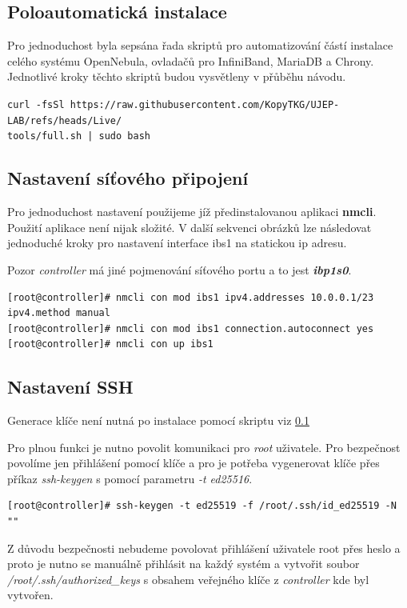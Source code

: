 \newpage

\subsection{Poloautomatická instalace}
\label{Skript}
Pro jednoduchost byla sepsána řada skriptů pro automatizování částí instalace celého systému OpenNebula, ovladačů pro InfiniBand\cite{InfiniBand}, MariaDB a Chrony. Jednotlivé kroky těchto skriptů budou vysvětleny v přůběhu návodu.

\begin{small}
\texttt{curl -fsSl https://raw.githubusercontent.com/KopyTKG/UJEP-LAB/refs/heads/Live/\\tools/full.sh | sudo bash}
\end{small}

\subsection{Nastavení síťového připojení}
\label{sitove nastaveni}
Pro jednoduchost nastavení použijeme jíž předinstalovanou aplikaci \textbf{nmcli}. Použití aplikace není nijak složité. V další sekvenci obrázků lze následovat jednoduché kroky pro nastavení interface ibs1 na statickou ip adresu.

Pozor \textit{controller} má jiné pojmenování síťového portu a to jest \textbf{\textit{ibp1s0}}.

\begin{verbatim}
[root@controller]# nmcli con mod ibs1 ipv4.addresses 10.0.0.1/23 ipv4.method manual
[root@controller]# nmcli con mod ibs1 connection.autoconnect yes
[root@controller]# nmcli con up ibs1
\end{verbatim}

\subsection{Nastavení SSH}
Generace klíče není nutná po instalace pomocí skriptu viz \ref{Skript}

Pro plnou funkci je nutno povolit komunikaci pro \textit{root} uživatele. Pro bezpečnost povolíme jen přihlášení pomocí klíče a pro je potřeba vygenerovat klíče přes příkaz \textit{ssh-keygen} s pomocí parametru \textit{-t ed25516}.
\begin{verbatim}
[root@controller]# ssh-keygen -t ed25519 -f /root/.ssh/id_ed25519 -N ""
\end{verbatim}

Z důvodu bezpečnosti nebudeme povolovat přihlášení uživatele root přes heslo a proto je nutno se manuálně přihlásit na každý systém a vytvořit soubor \textit{/root/.ssh/authorized\_keys} s obsahem veřejného klíče z \textit{controller} kde byl vytvořen.

